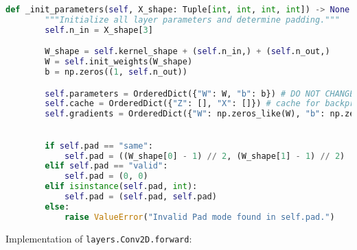 \begin{lstlisting}[language=Python]
    def _init_parameters(self, X_shape: Tuple[int, int, int, int]) -> None:
        """Initialize all layer parameters and determine padding."""
        self.n_in = X_shape[3]

        W_shape = self.kernel_shape + (self.n_in,) + (self.n_out,)
        W = self.init_weights(W_shape)
        b = np.zeros((1, self.n_out))

        self.parameters = OrderedDict({"W": W, "b": b}) # DO NOT CHANGE THE KEYS
        self.cache = OrderedDict({"Z": [], "X": []}) # cache for backprop
        self.gradients = OrderedDict({"W": np.zeros_like(W), "b": np.zeros_like(b)}) # parameter gradients initialized to zero
                                                                                     # MUST HAVE THE SAME KEYS AS `self.parameters`

        if self.pad == "same":
            self.pad = ((W_shape[0] - 1) // 2, (W_shape[1] - 1) // 2)
        elif self.pad == "valid":
            self.pad = (0, 0)
        elif isinstance(self.pad, int):
            self.pad = (self.pad, self.pad)
        else:
            raise ValueError("Invalid Pad mode found in self.pad.")

\end{lstlisting}

Implementation of \texttt{layers.Conv2D.forward}:

